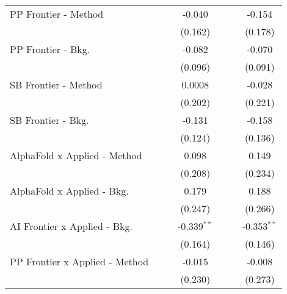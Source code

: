 \begin{tabular}{lcccccc}
   PP Frontier - Method           &                &              & -0.040         &                &             & -0.154\\   
                                  &                &              & (0.162)        &                &             & (0.178)\\   
   PP Frontier - Bkg.             &                &              & -0.082         &                &             & -0.070\\   
                                  &                &              & (0.096)        &                &             & (0.091)\\   
   SB Frontier - Method           &                &              & 0.0008         &                &             & -0.028\\   
                                  &                &              & (0.202)        &                &             & (0.221)\\   
   SB Frontier - Bkg.             &                &              & -0.131         &                &             & -0.158\\   
                                  &                &              & (0.124)        &                &             & (0.136)\\   
   AlphaFold x Applied - Method   &                &              & 0.098          &                &             & 0.149\\   
                                  &                &              & (0.208)        &                &             & (0.234)\\   
   AlphaFold x Applied - Bkg.     &                &              & 0.179          &                &             & 0.188\\   
                                  &                &              & (0.247)        &                &             & (0.266)\\   
   AI Frontier x Applied - Bkg.   &                &              & -0.339$^{**}$  &                &             & -0.353$^{**}$\\   
                                  &                &              & (0.164)        &                &             & (0.146)\\   
   PP Frontier x Applied - Method &                &              & -0.015         &                &             & -0.008\\   
                                  &                &              & (0.230)        &                &             & (0.273)\\   

\end{tabular}

